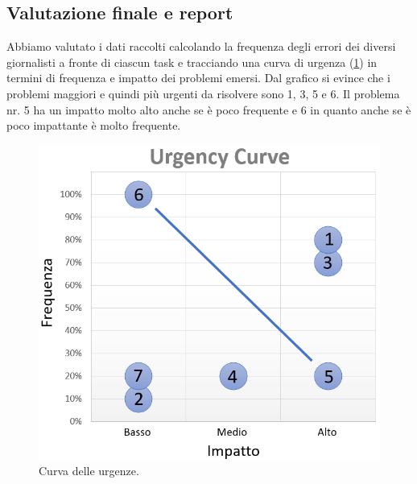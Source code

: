 \subsection{Valutazione finale e report}
Abbiamo valutato i dati raccolti calcolando la frequenza degli errori dei diversi giornalisti a fronte di ciascun task e tracciando una curva di urgenza (\ref{fig:urgency-curves}) in termini di frequenza e impatto dei problemi emersi.
Dal grafico  si evince che i problemi maggiori e quindi più urgenti da risolvere sono 1, 3, 5 e 6. Il problema nr. 5 ha un impatto molto alto anche se è poco frequente e  6 in quanto anche se è poco impattante è molto frequente.

\begin{figure}[H]
    \centering
    \includegraphics[width=0.5\columnwidth]{../../../assets/images/verifica-risorse-esistenti/urgency_curve}
    \caption{Curva delle urgenze.}
    \label{fig:urgency-curves}
\end{figure}
